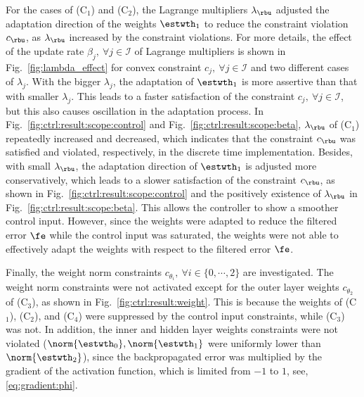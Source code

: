 \documentclass[lettersize,journal]{IEEEtran}
\begin{document}
For the cases of (C$_1$) and (C$_2$), the Lagrange multipliers $\lambda_{\rbu}$ adjusted the adaptation direction of the weights $\estwth_1$ to reduce the constraint violation $c_{\rbu}$, as $\lambda_{\rbu}$ increased by the constraint violations.
For more details, the effect of the update rate $\beta_j,\ \forall j\in\mathcal I$ of Lagrange multipliers is shown in Fig.~\ref{fig:lambda_effect} for convex constraint $c_j,\ \forall j\in\mathcal I$ and two different cases of $\lambda_j$.
With the bigger $\lambda_j$, the adaptation of $\estwth_1$ is more assertive than that with smaller $\lambda_j$.
This leads to a faster satisfaction of the constraint $c_j,\ \forall j\in\mathcal I$, but this also causes oscillation in the adaptation process.
In Fig.~\ref{fig:ctrl:result:scope:control} and Fig.~\ref{fig:ctrl:result:scope:beta}, $\lambda_{\rbu}$ of (C$_1$) repeatedly increased and decreased, which indicates that the constraint $c_{\rbu}$ was satisfied and violated, respectively, in the discrete time implementation.
Besides, with small $\lambda_{\rbu}$, the adaptation direction of $\estwth_1$ is adjusted more conservatively, which leads to a slower satisfaction of the constraint $c_{\rbu}$, as shown in Fig.~\ref{fig:ctrl:result:scope:control} and the positively existence of $\lambda_{\rbu}$ in Fig.~\ref{fig:ctrl:result:scope:beta}.
This allows the controller to show a smoother control input.
However, since the weights were adapted to reduce the filtered error $\fe$ while the control input was saturated, the weights were not able to effectively adapt the weights with respect to the filtered error $\fe$.

\hfill 

Finally, the weight norm constraints $c_{\theta_i},\ \forall i\in\{0,\cdots,2\}$ are investigated.
The weight norm constraints were not activated except for the outer layer weights $c_{\theta_2}$ of (C$_3$), as shown in Fig.~\ref{fig:ctrl:result:weight}.
This is because the weights of (C$_1$), (C$_2$), and (C$_4$) were suppressed by the control input constraints, while (C$_3$) was not.
In addition, the inner and hidden layer weights constraints were not violated (\ie $\norm{\estwth_0},\norm{\estwth_1}$ were uniformly lower than $\norm{\estwth_2}$), since the backpropagated error was multiplied by the gradient of the activation function, which is limited from $-1$ to $1$, \ie see, \eqref{eq:gradient:phi}.  
\end{document}
